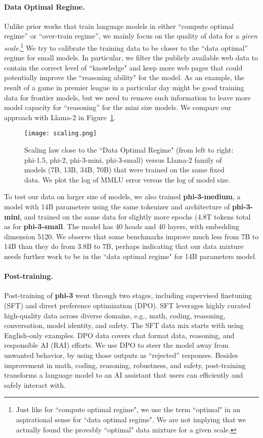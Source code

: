 \paragraph{Data Optimal Regime.} Unlike prior works that train language models in either ``compute optimal regime'' \cite{hoffmann2022training} or ``over-train regime'', we mainly focus on the quality of data for a {\em given scale}.\footnote{Just like for ``compute optimal regime", we use the term ``optimal" in an aspirational sense for ``data optimal regime". We are not implying that we actually found the provably ``optimal" data mixture for a given scale.} We try to calibrate the training data to be closer to the ``data optimal'' regime for small models. In particular, we filter the publicly available web data to contain the correct level of ``knowledge" and keep more web pages that could potentially improve the ``reasoning ability" for the model. As an example, the result of a game in premier league in a particular day might be good training data for frontier models, but we need to remove such information to leave more model capacity for ``reasoning'' for the mini size models. We compare our approach with Llama-2 in Figure~\ref{fig:enter-label}.
\begin{figure}
    \centering
    \texttt{[image: scaling.png]}
    \caption{Scaling law close to the ``Data Optimal Regime" (from left to right: phi-1.5, phi-2, phi-3-mini, phi-3-small) versus Llama-2 family of models (7B, 13B, 34B, 70B) that were trained on the same fixed data. We plot the log of MMLU error versus the log of model size.}
    \label{fig:enter-label}
\end{figure}

To test our data on larger size of models, we also trained \textbf{phi-3-medium}, a model with 14B parameters using the  same tokenizer and architecture of \textbf{phi-3-mini}, and trained on the same data for slightly more epochs (4.8T tokens total as for \textbf{phi-3-small}. The model has 40 heads and 40 layers, with embedding dimension 5120. We observe that some benchmarks improve much less from 7B to 14B than they do from 3.8B to 7B, perhaps indicating that our data mixture needs further work to be in the ``data optimal regime" for 14B parameters model.

\paragraph{Post-training.}
Post-training of \textbf{phi-3} went through  two stages, including supervised finetuning (SFT) and direct preference  optimization (DPO). SFT leverages highly curated  high-quality data across diverse domains, e.g., math, coding, reasoning, conversation, model identity, and safety. The SFT data mix starts with using English-only examples. DPO data covers chat format data, reasoning, and responsible AI (RAI) efforts. We use DPO to steer the model away from unwanted behavior, by using those outputs as “rejected” responses. Besides improvement in math, coding, reasoning, robustness, and safety, post-training transforms a language model to an AI assistant that users can efficiently and safely interact with.

